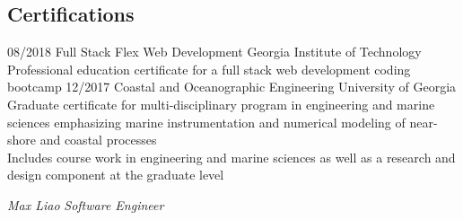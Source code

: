 \documentclass[]{cv}
\begin{document}
\begin{body}
	\section{Certifications\\}
	\begin{entrylist}
		\entry
		{08/2018}
		{Full Stack Flex Web Development}
		{Georgia Institute of Technology}
		{Professional education certificate for a full stack web development coding bootcamp}
		\entry
		{12/2017}
		{Coastal and Oceanographic Engineering}
		{University of Georgia}
		{Graduate certificate for multi-disciplinary program in engineering and marine sciences emphasizing marine instrumentation and numerical modeling of near-shore and coastal processes\\ Includes course work in engineering and marine sciences as well as a research and design component at the graduate level}
	\end{entrylist}
	\begin{flushright}
		\emph{Max Liao }
		\emph{Software Engineer}
	\end{flushright}
\end{body}
\end{document}
